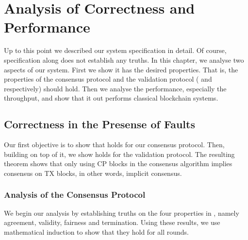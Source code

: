 \chapter{Analysis of Correctness and Performance}
\label{ch:analysis}

Up to this point we described our system specification in detail.
Of course, specification along does not establish any truths.
In this chapter, we analyse two aspects of our system.
First we show it has the desired properties.
That is, the properties of the consensus protocol and the validation protocol ( and  respectively) should hold.
Then we analyse the performance, especially the throughput,
and show that it out performs classical blockchain systems.

\section{Correctness in the Presense of Faults}
Our first objective is to show that  holds for our consensus protocol.
Then, building on top of it, we show  holds for the validation protocol.
The resulting theorem shows that only using CP blocks in the consensus algorithm implies consensus on TX blocks,
in other words, implicit consensus.


\subsection{Analysis of the Consensus Protocol}

We begin our analysis by establishing truths on the four properties in ,
namely agreement, validity, fairness and termination.
Using these results, we use mathematical induction to show that they hold for all rounds.


